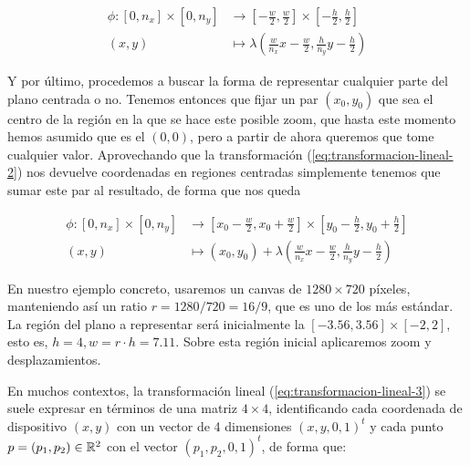 \begin{equation}
    \label{eq:transformacion-lineal-2}
    \begin{split}
        \phi:[0,n_x]\times[0,n_y] & \longrightarrow \left[-\frac{w}{2},\frac{w}{2}\right]\times\left[-\frac{h}{2},\frac{h}{2}\right] \\
        (x,y) & \longmapsto \lambda\left(\frac{w}{n_x}x-\frac{w}{2},\frac{h}{n_y}y-\frac{h}{2}\right)
    \end{split}
\end{equation}

Y por último, procedemos a buscar la forma de representar cualquier parte del plano centrada o no. Tenemos entonces que fijar un par $(x_0,y_0)$ que sea el centro de la región en la que se hace este posible zoom, que hasta este momento hemos asumido que es el $(0,0)$, pero a partir de ahora queremos que tome cualquier valor. Aprovechando que la transformación (\ref{eq:transformacion-lineal-2}) nos devuelve coordenadas en regiones centradas simplemente tenemos que sumar este par al resultado, de forma que nos queda 

\begin{equation}
    \label{eq:transformacion-lineal-3}
    \begin{split}
        \phi:[0,n_x]\times[0,n_y] & \longrightarrow \left[x_0-\frac{w}{2},x_0+\frac{w}{2}\right]\times\left[y_0-\frac{h}{2},y_0+\frac{h}{2}\right] \\
        (x,y) & \longmapsto (x_0,y_0) + \lambda\left(\frac{w}{n_x}x-\frac{w}{2},\frac{h}{n_y}y-\frac{h}{2}\right)
    \end{split}
\end{equation}

En nuestro ejemplo concreto, usaremos un canvas de $1280\times 720$ píxeles, manteniendo así un ratio $r=1280/720=16/9$, que es uno de los más estándar. La región del plano a representar será inicialmente la $[-3.56,3.56]\times[-2,2]$, esto es, $h=4, w=r\cdot h =7.11$. Sobre esta región inicial aplicaremos zoom y desplazamientos.

En muchos contextos, la transformación lineal (\ref{eq:transformacion-lineal-3}) se suele expresar en términos de una matriz $4\times 4$, identificando cada coordenada de dispositivo $(x,y)$ con un vector de 4 dimensiones $(x,y,0,1)^t$ y cada punto $p=(p_1,p_2)\in\mathbb{R}^2$ con el vector $(p_1, p_2, 0 ,1)^t$, de forma que:

